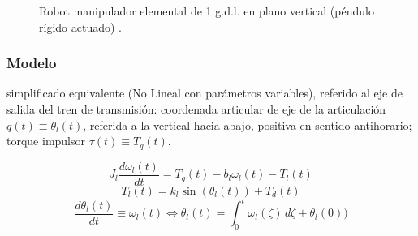 \documentclass[a4paper, 10pt, journal]{ieeeconf}
\begin{document}
\begin{figure}[thpb]
    \centering
    \begin{adjustbox}{max width=\columnwidth}
    \end{adjustbox}
    \caption{Robot manipulador elemental de 1 g.d.l. en plano vertical (péndulo rígido actuado) \cite{c2}.}
    \label{brazo}
\end{figure}
\bigskip


\subsubsection{\textbf{Modelo}} simplificado equivalente (No Lineal con parámetros variables), referido al eje de salida del tren de transmisión: coordenada articular de eje de la articulación $q(t) \equiv \theta_l(t)$, referida a la vertical hacia abajo, positiva en sentido antihorario; torque impulsor $\tau(t) \equiv T_q(t)$.

\begin{equation}
    J_l \frac{d\omega_l(t)}{dt} = T_q(t) - b_l \omega_l(t) - T_l(t)
    \label{subsistema mecánico referido a eje de salida}
\end{equation}
\begin{equation}
    T_l(t) = k_l \sin(\theta_l(t)) + T_d(t)
    \label{torque de carga}
\end{equation}
\begin{equation}
    \frac{d\theta_l(t)}{dt} \equiv \omega_l(t) \Leftrightarrow \theta_l(t) = \int_{0}^{t} \omega_l(\zeta) \, d\zeta + \theta_l(0))
    \label{velocidad y posición de la carga}
\end{equation}
\end{document}
